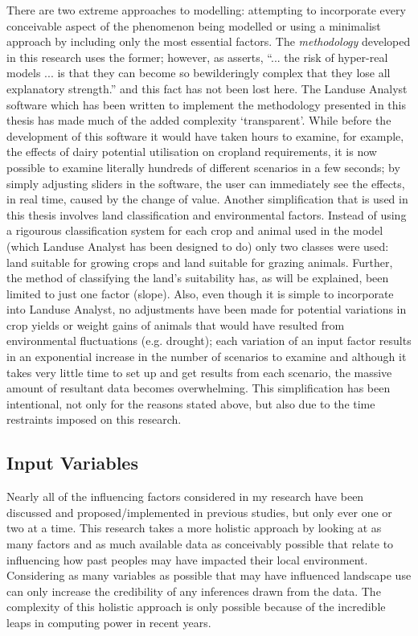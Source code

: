 There are two extreme approaches to modelling: attempting to incorporate every conceivable aspect of the phenomenon being modelled or using a minimalist approach by including only the most essential factors.  The \emph{methodology} developed in this research uses the former; however, as \citet[3]{Bevan2008} asserts, ``... the risk of hyper-real 
models ... is that they can become so bewilderingly complex that they lose all explanatory strength.'' and this fact has not been lost here.  The Landuse Analyst software which has been written to implement the methodology presented in this thesis has made much of the added complexity `transparent'.  While before the development of this software it would have taken hours to examine, for example, the effects of dairy potential utilisation on cropland requirements, it is now possible to examine literally hundreds of different scenarios in a few seconds; by simply adjusting sliders in the software, the user can immediately see the effects, in real time, caused by the change of value.  Another simplification that is used in this thesis involves land classification and environmental factors.  Instead of using a rigourous classification system for each crop and animal used in the model (which Landuse Analyst has been designed to do) only two classes were used: land suitable for growing crops and land suitable for grazing animals.  Further, the method of classifying the land's suitability has, as will be explained, been limited to just one factor (slope).  Also, even though it is simple to incorporate into Landuse Analyst, no adjustments have been made for potential variations in crop yields or weight gains of animals that would have resulted from environmental fluctuations (e.g. drought); each variation of an input factor results in an exponential increase in the number of scenarios to examine and although it takes very little time to set up and get results from each scenario, the massive amount of resultant data becomes overwhelming.  This simplification has been intentional, not only for the reasons stated above, but also due to the time restraints imposed on this research.

\subsection{Input Variables}
	\label{InputVariables}
	Nearly all of the influencing factors considered in my research have been discussed and proposed/implemented in previous studies, but only ever one or two at a time. This research takes a more holistic approach by looking at as many factors and as much available data as conceivably possible that relate to influencing how past peoples may have impacted their local environment.  Considering as many variables as possible that may have influenced landscape use can only increase the credibility of any inferences drawn from the data.  The complexity of this holistic approach is only possible because of the incredible leaps in computing power in recent years.   
	
